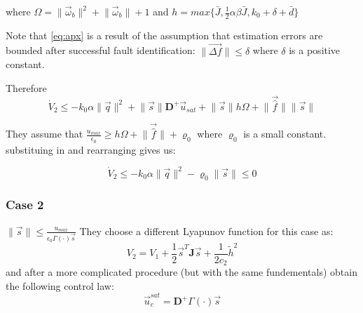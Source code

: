 where $\Omega = \lVert\vec{\omega}_b\rVert^2 + \lVert\vec{\omega}_b\rVert + 1$ and $h=max\{\bar{J},\frac{1}{2}\alpha\beta\bar{J},k_0 + \delta + \bar{d}\}$

Note that \ref{eq:apx} is a result of the assumption that estimation errors are bounded after successful fault identification: $\lVert\vec{\Delta f}\rVert \leq \delta$ where $\delta$ is a positive constant.

Therefore 
\begin{equation}
    \dot{V}_2 \leq -k_0\alpha\lVert \vec{q} \rVert^2 + \lVert \vec{s} \rVert\mathbf{D}^+\vec{u}_{sat} + \lVert \vec{s} \rVert h \Omega + \lVert \vec{\hat{f}} \rVert\lVert \vec{s} \rVert
\end{equation}

They assume that $\frac{u_{max}}{\epsilon_0} \geq h\Omega + \lVert \vec{\hat{f}} \rVert + \varrho_0$ where $\varrho_0$ is a small constant. substituing in and rearranging gives us:

\begin{equation}
    \dot{V}_2 \leq -k_0\alpha\lVert \vec{q} \rVert^2 - \varrho_0\lVert \vec{s} \rVert \leq 0
\end{equation}
\subsubsection{Case 2} $\lVert \vec{s} \rVert \leq \frac{u_{max}}{\epsilon_0\Gamma(\cdot)\vec{s}}$
They choose a different Lyapunov function for this case as:
\begin{equation}
    V_2=V_1+\frac{1}{2}\vec{s}^T\mathbf{J}\vec{s} + \frac{1}{2c_2}\tilde{h}^2
\end{equation}
and after a more complicated procedure (but with the same fundementals) obtain the following control law:
\begin{equation}
    \vec{u}_c^{sat} = \mathbf{D}^+ \Gamma(\cdot) \vec{s}
\end{equation}